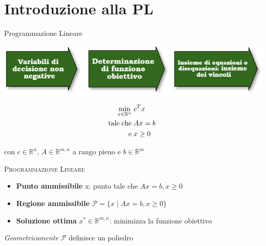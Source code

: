 \begin{frame}[t,plain]
\titlepage
\end{frame}

\begin{frame}
	\frametitle{}
	\hypersetup{linkcolor=black}
	\tableofcontents
\end{frame}




\section{Introduzione alla PL}

\begin{frame}{\textrm {Programmazione Lineare}}
	\begin{center}
	\transblindsvertical\includegraphics[width = 9 cm]{fasi.png}
	\end{center}
\pause
\begin{equation*}
\begin{split}
\min\limits_{x\in\mathbb{R}^{n}}\;&c^{T}x\\
\text{tale\;che\;}&Ax= b\;\\\text{e\;}&x\geq0
\end{split}
\end{equation*}
\begin{center}
con $c\in\mathbb{R}^{n}$, $A\in\mathbb{R}^{m,n}$ a rango pieno e $b\in\mathbb{R}^{m}$
\end{center}	
\end{frame}


\begin{frame}{\textsc{\LARGE Programmazione Lineare}}
	\pause
	\begin{itemize}
		\item \textbf{Punto ammissibile} x: punto tale che $Ax = b, x\geq 0$
		\pause
		\item \textbf{Regione ammissibile} $\mathcal{P}=\{x\;|\; Ax = b, x\geq 0\}$
		\pause
		\item \textbf{Soluzione ottima} $x^{*}\in\mathbb{R}^{m,n}$: minimizza la funzione obiettivo
		\pause
	\end{itemize}
\pause
\centering\emph{Geometricamente} $\mathcal{P}$ definisce un poliedro
\end{frame}

